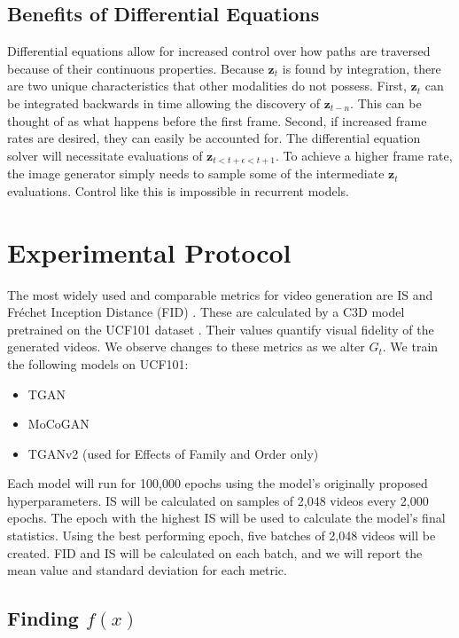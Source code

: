 \documentclass[tablecaption=bottom,pmlr]{jmlr}
\begin{document}
\subsection{Benefits of Differential Equations}

Differential equations allow for increased control over how paths are traversed because of their continuous properties. Because $\mathbf{z}_t$ is found by integration, there are two unique characteristics that other modalities do not possess. First, $\mathbf{z}_t$ can be integrated backwards in time allowing the discovery of $\mathbf{z}_{t-n}$. This can be thought of as what happens before the first frame. Second, if increased frame rates are desired, they can easily be accounted for. The differential equation solver will necessitate evaluations of $\mathbf{z}_{t<t+\epsilon<t+1}$. To achieve a higher frame rate, the image generator simply needs to sample some of the intermediate $\mathbf{z}_t$ evaluations. Control like this is impossible in recurrent models.



\section{Experimental Protocol}

The most widely used and comparable metrics for video generation are IS and Fr\'echet Inception Distance (FID) \citep{ttur}. These are calculated by a C3D model \citep{c3d} pretrained on the UCF101 dataset \citep{ucf101}.
Their values quantify visual fidelity of the generated videos. We observe changes to these metrics as we alter $G_t$. We train the following models on UCF101:
\begin{itemize}
    \item TGAN
    \item MoCoGAN
    \item TGANv2 (used for Effects of Family and Order only)
\end{itemize}

Each model will run for 100,000 epochs using the model's originally proposed hyperparameters. IS will be calculated on samples of 2,048 videos every 2,000 epochs. The epoch with the highest IS will be used to calculate the model's final statistics. Using the best performing epoch, five batches of 2,048 videos will be created. FID and IS will be calculated on each batch, and we will report the mean value and standard deviation for each metric.


\subsection[Finding f(x)]{Finding $f(x)$}
\end{document}
